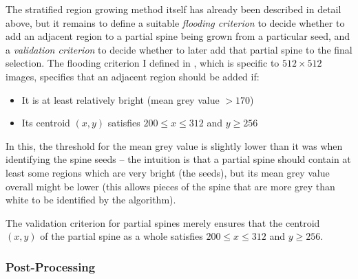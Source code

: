 The stratified region growing method itself has already been described in detail above, but it remains to define a suitable \emph{flooding criterion} to decide whether to add an adjacent region to a partial spine being grown from a particular seed, and a \emph{validation criterion} to decide whether to later add that partial spine to the final selection. The flooding criterion I defined in \cite{gvcispa09}, which is specific to $512 \times 512$ images, specifies that an adjacent region should be added if:
%
\begin{itemize}

\item It is at least relatively bright (mean grey value $> 170$)
\item Its centroid $(x,y)$ satisfies $200 \le x \le 312$ and $y \ge 256$

\end{itemize}
%
In this, the threshold for the mean grey value is slightly lower than it was when identifying the spine seeds -- the intuition is that a partial spine should contain at least some regions which are very bright (the seeds), but its mean grey value overall might be lower (this allows pieces of the spine that are more grey than white to be identified by the algorithm).

The validation criterion for partial spines merely ensures that the centroid $(x,y)$ of the partial spine as a whole satisfies $200 \le x \le 312$ and $y \ge 256$.

\subsubsection{Post-Processing}

